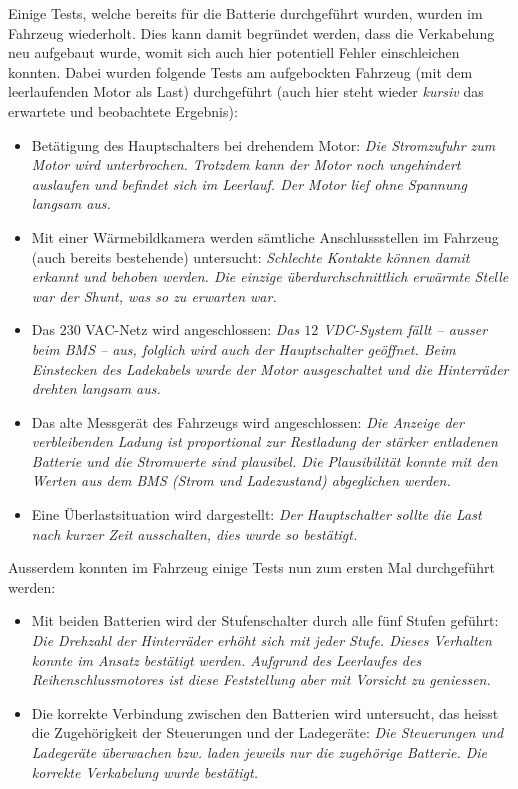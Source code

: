 \color{blue} Einige Tests, welche bereits für die Batterie durchgeführt wurden, wurden im Fahrzeug wiederholt. Dies kann damit begründet werden, dass die Verkabelung neu aufgebaut wurde, womit sich auch hier potentiell Fehler einschleichen konnten. Dabei wurden folgende Tests am aufgebockten Fahrzeug (mit dem leerlaufenden Motor als Last) durchgeführt (auch hier steht wieder \textit{kursiv} das erwartete und beobachtete Ergebnis): \begin{itemize}
	\item Betätigung des Hauptschalters bei drehendem Motor: \textit{Die Stromzufuhr zum Motor wird unterbrochen. Trotzdem kann der Motor noch ungehindert auslaufen und befindet sich im Leerlauf. Der Motor lief ohne Spannung langsam aus.}
	\item Mit einer Wärmebildkamera werden sämtliche Anschlussstellen im Fahrzeug (auch bereits bestehende) untersucht: \textit{Schlechte Kontakte können damit erkannt und behoben werden. Die einzige überdurchschnittlich erwärmte Stelle war der Shunt, was so zu erwarten war.}
	\item Das $230$ VAC-Netz wird angeschlossen: \textit{Das $12$ VDC-System fällt -- ausser beim BMS -- aus, folglich wird auch der Hauptschalter geöffnet. Beim Einstecken des Ladekabels wurde der Motor ausgeschaltet und die Hinterräder drehten langsam aus.}\pagebreak
	\item Das alte Messgerät des Fahrzeugs wird angeschlossen: \textit{Die Anzeige der verbleibenden Ladung ist proportional zur Restladung der stärker entladenen Batterie und die Stromwerte sind plausibel. Die Plausibilität konnte mit den Werten aus dem BMS (Strom und Ladezustand) abgeglichen werden.}
	\item Eine Überlastsituation wird dargestellt: \textit{Der Hauptschalter sollte die Last nach kurzer Zeit ausschalten, dies wurde so bestätigt.}
\end{itemize}

Ausserdem konnten im Fahrzeug einige Tests nun zum ersten Mal durchgeführt werden: \begin{itemize}
	\item Mit beiden Batterien wird der Stufenschalter durch alle fünf Stufen geführt: \textit{Die Drehzahl der Hinterräder erhöht sich mit jeder Stufe. Dieses Verhalten konnte im Ansatz bestätigt werden. Aufgrund des Leerlaufes des Reihenschlussmotores ist diese Feststellung aber mit Vorsicht zu geniessen.}
	\item Die korrekte Verbindung zwischen den Batterien wird untersucht, das heisst die Zugehörigkeit der Steuerungen und der Ladegeräte: \textit{Die Steuerungen und Ladegeräte überwachen bzw. laden jeweils nur die zugehörige Batterie. Die korrekte Verkabelung wurde bestätigt.}
\end{itemize}

